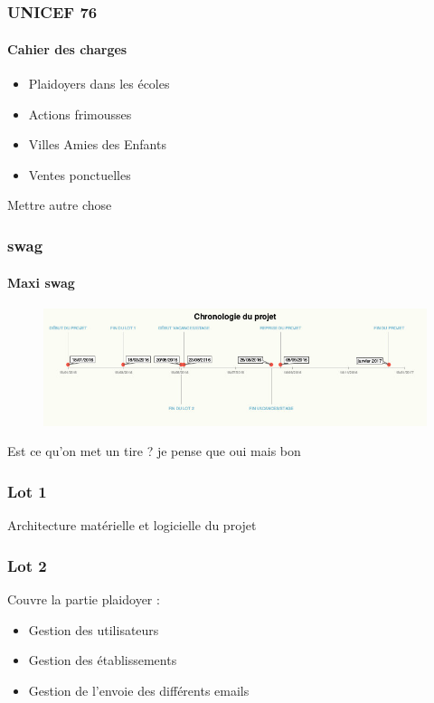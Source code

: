 \speaker{\Mathieu}
\subsection{} %



\begin{frame}
\frametitle{UNICEF 76}
\framesubtitle{Cahier des charges}
	\begin{itemize}
		\item Plaidoyers dans les \'ecoles
		\item Actions frimousses
		\item Villes Amies des Enfants
		\item Ventes ponctuelles
	\end{itemize}
	
	Mettre autre chose
\end{frame}




\begin{frame}
	\frametitle{swag}
	\framesubtitle{Maxi swag}
	\begin{figure}
		\centering
		\includegraphics[scale=0.65]{images/planningProjet1.jpeg}
	\end{figure}
	Est ce qu'on met un tire ? je pense que oui mais bon 
\end{frame}




\begin{frame}
	\frametitle{Lot 1}
	Architecture matérielle et logicielle du projet
\end{frame}


\speaker{\Michel}
\begin{frame}
	\frametitle{Lot 2}
	Couvre la partie plaidoyer :
	\begin{itemize}
		\item Gestion des utilisateurs
		\item Gestion des établissements
		\item Gestion de l'envoie des différents emails
	\end{itemize}
\end{frame}

